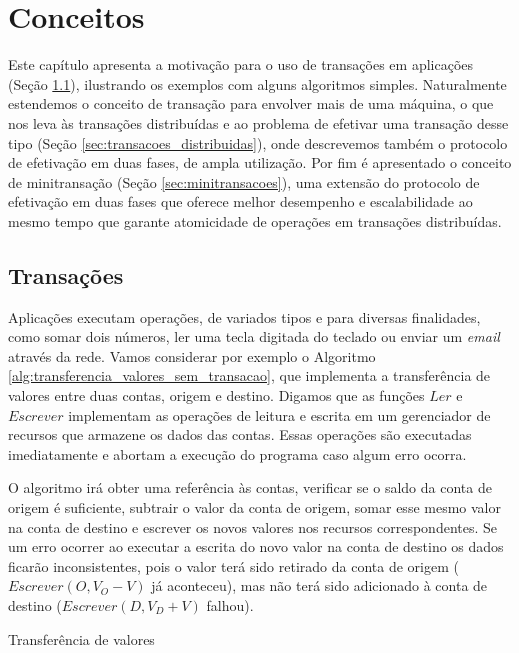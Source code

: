 \documentclass[11pt,twoside,a4paper]{book}
\begin{document}
\chapter{Conceitos}
\label{chap:conceitos}
Este capítulo apresenta a motivação para o uso de transações em aplicações
(Seção \ref{sec:transacoes}), ilustrando os exemplos com alguns algoritmos
simples.
Naturalmente estendemos o conceito de transação para envolver mais de uma
máquina, o que nos leva às transações distribuídas e ao problema de efetivar uma
transação desse tipo (Seção \ref{sec:transacoes_distribuidas}), onde descrevemos
também o protocolo de efetivação em duas fases, de ampla utilização. Por fim é
apresentado o conceito de minitransação (Seção \ref{sec:minitransacoes}), uma extensão do protocolo de efetivação em duas fases que oferece melhor
desempenho e escalabilidade ao mesmo tempo que garante atomicidade de operações
em transações distribuídas.

\section{Transações}
\label{sec:transacoes}
Aplicações executam operações, de variados tipos e para diversas finalidades, como somar dois números, ler uma tecla digitada do teclado ou enviar um \emph{email} através da rede. Vamos considerar por exemplo o Algoritmo \ref{alg:transferencia_valores_sem_transacao}, que implementa a transferência de valores entre duas contas, origem e destino. Digamos que as funções $Ler$ e $Escrever$ implementam as operações de leitura e escrita em um gerenciador de recursos que armazene os dados das contas. Essas operações são executadas imediatamente e abortam a execução do programa caso algum erro ocorra.

O algoritmo irá obter uma referência às contas, verificar se o saldo da conta de origem é suficiente, subtrair o valor da conta de origem, somar esse mesmo valor na conta de destino e escrever os novos valores nos recursos correspondentes. Se um erro ocorrer ao executar a escrita do novo valor na conta de destino os dados ficarão inconsistentes, pois o valor terá sido retirado da conta de origem ($Escrever(O, V_O - V)$ já aconteceu), mas não terá sido adicionado à conta de destino ($Escrever(D, V_D + V)$ falhou).

\begin{algorithm}
\caption{Transferência de valores}
\label{alg:transferencia_valores_sem_transacao}
\end{algorithm}
\end{document}
